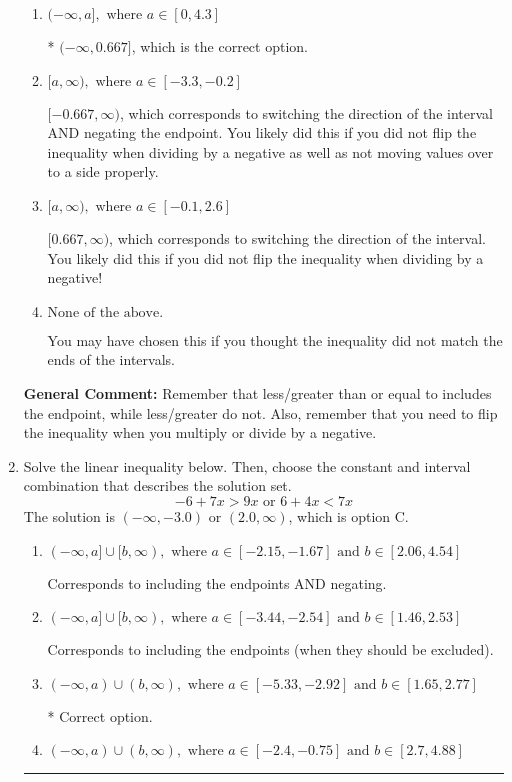 \documentclass{extbook}[14pt]
\newcommand{\litem}[1]{\item #1

\rule{\textwidth}{0.4pt}}
\begin{document}
\begin{enumerate}
{\begin{enumerate}[label=\Alph*.]
 $(-\infty, -0.667]$, which corresponds to negating the endpoint of the solution.
\item \( (-\infty, a], \text{ where } a \in [0, 4.3] \)

* $(-\infty, 0.667]$, which is the correct option.
\item \( [a, \infty), \text{ where } a \in [-3.3, -0.2] \)

 $[-0.667, \infty)$, which corresponds to switching the direction of the interval AND negating the endpoint. You likely did this if you did not flip the inequality when dividing by a negative as well as not moving values over to a side properly.
\item \( [a, \infty), \text{ where } a \in [-0.1, 2.6] \)

 $[0.667, \infty)$, which corresponds to switching the direction of the interval. You likely did this if you did not flip the inequality when dividing by a negative!
\item \( \text{None of the above}. \)

You may have chosen this if you thought the inequality did not match the ends of the intervals.
\end{enumerate}

\textbf{General Comment:} Remember that less/greater than or equal to includes the endpoint, while less/greater do not. Also, remember that you need to flip the inequality when you multiply or divide by a negative.
}
\litem{
Solve the linear inequality below. Then, choose the constant and interval combination that describes the solution set.
\[ -6 + 7 x > 9 x \text{ or } 6 + 4 x < 7 x \]The solution is \( (-\infty, -3.0) \text{ or } (2.0, \infty) \), which is option C.\begin{enumerate}[label=\Alph*.]
\item \( (-\infty, a] \cup [b, \infty), \text{ where } a \in [-2.15, -1.67] \text{ and } b \in [2.06, 4.54] \)

Corresponds to including the endpoints AND negating.
\item \( (-\infty, a] \cup [b, \infty), \text{ where } a \in [-3.44, -2.54] \text{ and } b \in [1.46, 2.53] \)

Corresponds to including the endpoints (when they should be excluded).
\item \( (-\infty, a) \cup (b, \infty), \text{ where } a \in [-5.33, -2.92] \text{ and } b \in [1.65, 2.77] \)

 * Correct option.
\item \( (-\infty, a) \cup (b, \infty), \text{ where } a \in [-2.4, -0.75] \text{ and } b \in [2.7, 4.88] \)


\end{enumerate}}
\end{enumerate}
\end{document}
